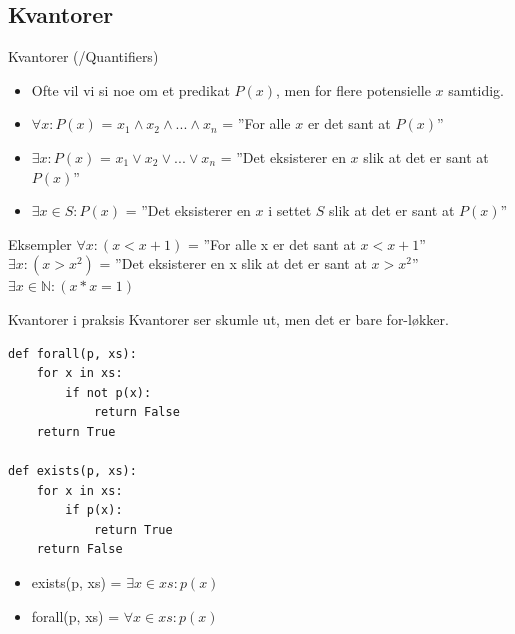 \subsection{Kvantorer}
\begin{frame}{Kvantorer (/Quantifiers)}
    \begin{itemize}
        \item Ofte vil vi si noe om et predikat $P(x)$, men for flere potensielle $x$ samtidig.
        \item $\forall x : P(x)$ = $x_1 \land x_2 \land ... \land x_n$ = ''For alle $x$ er det sant at $P(x)$''
        \item $\exists x : P(x)$ = $x_1 \lor x_2 \lor ... \lor x_n$ = ''Det eksisterer en $x$ slik at det er sant at $P(x)$''
        \item $\exists x \in S : P(x)$ = ''Det eksisterer en $x$ i settet $S$ slik at  det er sant at $P(x)$''
    \end{itemize}
    
    \pause
    \begin{block}{Eksempler}
        $\forall x : (x < x + 1)$ = ''For alle x er det sant at $x < x +1$''\\
        $\exists x : (x > x^2)$ = ''Det eksisterer en x slik at det er sant at $x > x^2$''\\
        $\exists x \in \mathbb{N} : (x*x = 1)$\\
    \end{block}
\end{frame}

\begin{frame}[fragile]{Kvantorer i praksis}
    Kvantorer ser skumle ut, men det er bare for-løkker.
    \begin{verbatim}
def forall(p, xs):
    for x in xs:
        if not p(x):
            return False
    return True
    
def exists(p, xs):
    for x in xs:
        if p(x):
            return True
    return False
    \end{verbatim}
    
    \pause
    \begin{itemize}
        \item exists(p, xs) = $\exists x \in xs : p(x)$
        \item forall(p, xs) = $\forall x \in xs : p(x)$
    \end{itemize}
\end{frame}

